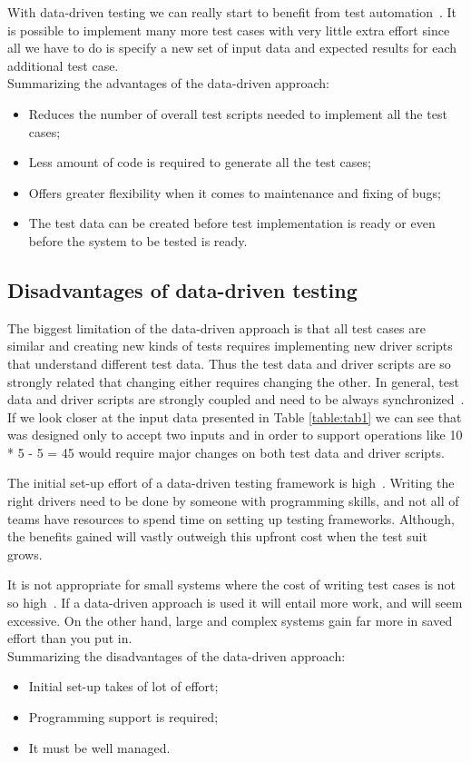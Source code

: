 With data-driven testing we can really start to benefit from test automation~\cite{Fewster99}.
It is possible to implement many more test cases with very little extra effort
since all we have to do is specify a new set of input data and expected results
for each additional test case.\\[1mm]

\noindent Summarizing the advantages of the data-driven approach:

\begin{itemize}
\item Reduces the number of overall test scripts needed to
implement all the test cases;
\item Less amount of code is required to generate all the test cases;
\item Offers greater flexibility when it comes to maintenance and fixing of bugs;
\item The test data can be created before test implementation is ready or even
before the system to be tested is ready.
\end{itemize}

\subsection{Disadvantages of data-driven testing}

The biggest limitation of the data-driven approach is that all test cases are
similar and creating new kinds of tests requires implementing new driver scripts
that understand different test data. Thus the test data and driver scripts are
so strongly related that changing either requires changing the other. In general,
test data and driver scripts are strongly coupled and need to be always
synchronized~\cite{Fewster99}. If we look closer at the input data presented in
Table \ref{table:tab1} we can see that was designed only to accept two inputs
and in order to support operations like 10 * 5 - 5 = 45 would require major
changes on both test data and driver scripts.

The initial set-up effort of a data-driven testing framework is high~\cite{Fewster99}.
Writing the right drivers need to be done by someone with programming skills,
and not all of teams have resources to spend time on setting up testing
frameworks. Although, the benefits gained will vastly outweigh this upfront cost
when the test suit grows.

It is not appropriate for small systems where the cost of writing test cases is
not so high~\cite{Fewster99}. If a data-driven approach is used it will entail
more work, and will seem excessive. On the other hand, large and complex systems
gain far more in saved effort than you put in.\\[1mm]

\noindent Summarizing the disadvantages of the data-driven approach:
\begin{itemize}
\item Initial set-up takes of lot of effort;
\item Programming support is required;
\item It must be well managed.
\end{itemize}
